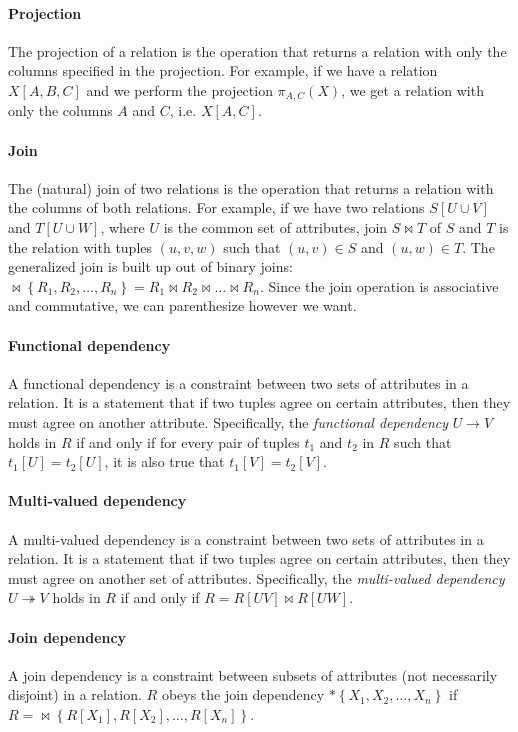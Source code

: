 \paragraph{Projection}  The projection of a relation is the operation that returns a
relation with only the columns specified in the projection.  For example, if we have a
relation $X[A, B, C]$ and we perform the projection $\pi_{A, C}(X)$, we get a
relation with only the columns $A$ and $C$, i.e. $X[A, C]$.

\paragraph{Join}  The (natural) join of two relations is the operation that returns a
relation with the columns of both relations.  For example, if we have two relations $S[U
\cup V]$ and $T[U \cup W]$, where $U$ is the common set of attributes, join $S \bowtie T$
of $S$ and $T$ is the relation with tuples $(u, v, w)$ such that $(u, v) \in S$ and $(u,
w) \in T$.  The generalized join is built up out of binary joins:  $\bowtie \left\{ R_1,
R_2, \dots, R_n \right\} = R_1 \bowtie R_2 \bowtie \dots \bowtie R_n$. Since the join
operation is associative and commutative, we can parenthesize however we want.

\paragraph{Functional dependency}  A functional dependency is a constraint between two
sets of attributes in a relation.  It is a statement that if two tuples agree on certain
attributes, then they must agree on another attribute.  Specifically, the \emph{functional
dependency} $U \to V$ holds in $R$ if and only if for every pair of tuples $t_1$ and $t_2$
in $R$ such that $t_1[U] = t_2[U]$, it is also true that $t_1[V] = t_2[V]$.

\paragraph{Multi-valued dependency}  A multi-valued dependency is a constraint between
two sets of attributes in a relation.  It is a statement that if two tuples agree on
certain attributes, then they must agree on another set of attributes.  Specifically, the
\emph{multi-valued dependency} $U \twoheadrightarrow V$ holds in $R$ if and only if $R =
R[UV] \bowtie R[UW]$.

\paragraph{Join dependency}  A join dependency is a constraint between subsets of
attributes (not necessarily disjoint) in a relation.  $R$ obeys the join dependency $*
\left\{ X_1, X_2, \dots, X_n \right\}$ if $R = \bowtie \left\{ R[X_1], R[X_2], \dots,
R[X_n] \right\}$.

